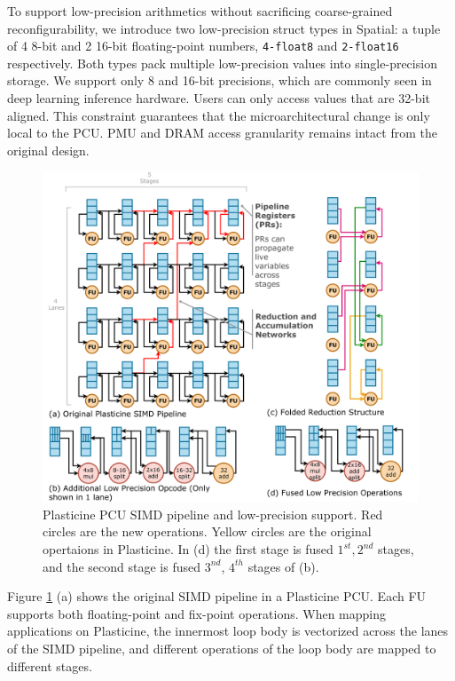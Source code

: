 To support low-precision arithmetics without sacrificing coarse-grained reconfigurability,
we introduce two low-precision struct types in Spatial: a tuple of 4 8-bit and 2 16-bit floating-point 
numbers, \texttt{4-float8} and \texttt{2-float16} respectively.
Both types pack multiple low-precision values into single-precision storage.
We support only 8 and 16-bit precisions, which are commonly seen in deep learning inference hardware.
Users can only access values that are 32-bit aligned.
This constraint guarantees that the microarchitectural change is only local to the PCU.
PMU and DRAM access granularity remains intact from the original design.

\begin{figure}
  \centering
  \includegraphics[width=1\columnwidth]{figs/lowprec.pdf}
  \caption{Plasticine PCU SIMD pipeline and low-precision support.
  Red circles are the new operations. Yellow circles are the original opertaions in Plasticine.
  In (d) the first stage is fused $1^{st}, 2^{nd}$ stages, and the second stage is fused
  $3^{nd}$, $4^{th}$ stages of (b).
   }
  \label{fig:lowprec}
\end{figure}
Figure \ref{fig:lowprec} (a) shows the original SIMD pipeline in a Plasticine PCU.
Each FU supports both floating-point and fix-point operations.
When mapping applications on Plasticine,
  the innermost loop body is vectorized across the lanes of the
SIMD pipeline, and different operations of the loop body are mapped to different stages.

